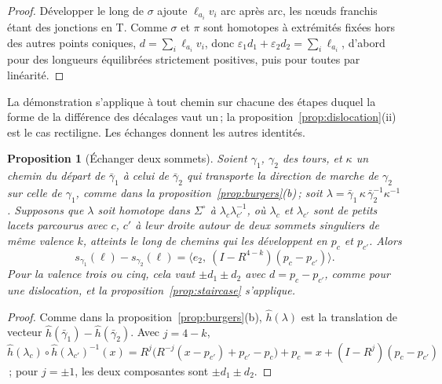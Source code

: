 \documentclass[11pt,a4paper]{article}
\newtheorem{proposition}{Proposition}
\newcommand{\shift}{s}
\begin{document}
\begin{proof}
Développer le long de $\sigma$ ajoute $\ell_{a_i} v_i$ arc après arc, les
nœuds franchis étant des jonctions en T. Comme $\sigma$ et $\pi$ sont
homotopes à extrémités fixées hors des autres points coniques, $d = \sum_i
\ell_{a_i} v_i$, donc $\varepsilon_1 d_1 + \varepsilon_2 d_2 = \sum_i
\ell_{a_i}$, d'abord pour des longueurs équilibrées strictement positives,
puis pour toutes par linéarité.
\end{proof}

La démonstration s'applique à tout chemin sur chacune des étapes duquel la
forme de la différence des décalages vaut un\,; la
proposition~\ref{prop:dislocation}(ii) est le cas rectiligne. Les échanges
donnent les autres identités.

\begin{proposition}[Échanger deux sommets]\label{prop:swap}
Soient $\gamma_1$, $\gamma_2$ des tours, et $\kappa$ un chemin du départ de
$\bar\gamma_1$ à celui de $\bar\gamma_2$ qui transporte la direction de marche
de $\gamma_2$ sur celle de $\gamma_1$, comme dans la
proposition~\ref{prop:burgers}(b)\,; soit $\lambda = \bar\gamma_1\, \kappa\,
\bar\gamma_2^{-1} \kappa^{-1}$. Supposons que $\lambda$ soit homotope dans
$\Sigma^\circ$ à $\lambda_c \lambda_{c'}^{-1}$, où $\lambda_c$ et
$\lambda_{c'}$ sont de petits lacets parcourus avec $c$, $c'$ à leur droite
autour de deux sommets singuliers de même valence $k$, atteints le long de
chemins qui les développent en $p_c$ et $p_{c'}$. Alors
\[
  \shift_{\gamma_1}(\ell) - \shift_{\gamma_2}(\ell) = \bigl\langle e_2,\
  (I - R^{4-k})(p_c - p_{c'}) \bigr\rangle .
\]
Pour la valence trois ou cinq, cela vaut $\pm d_1 \pm d_2$ avec $d = p_c -
p_{c'}$, comme pour une dislocation, et la proposition~\ref{prop:staircase}
s'applique.
\end{proposition}

\begin{proof}
Comme dans la proposition~\ref{prop:burgers}(b), $\hat h(\lambda)$ est la
translation de vecteur $\hat h(\bar\gamma_1) - \hat h(\bar\gamma_2)$. Avec $j
= 4 - k$, $\hat h(\lambda_c) \circ \hat h(\lambda_{c'})^{-1}(x) =
R^j\bigl(R^{-j}(x - p_{c'}) + p_{c'} - p_c\bigr) + p_c = x + (I - R^j)(p_c -
p_{c'})$\,; pour $j = \pm1$, les deux composantes sont $\pm d_1 \pm d_2$.
\end{proof}
\end{document}
